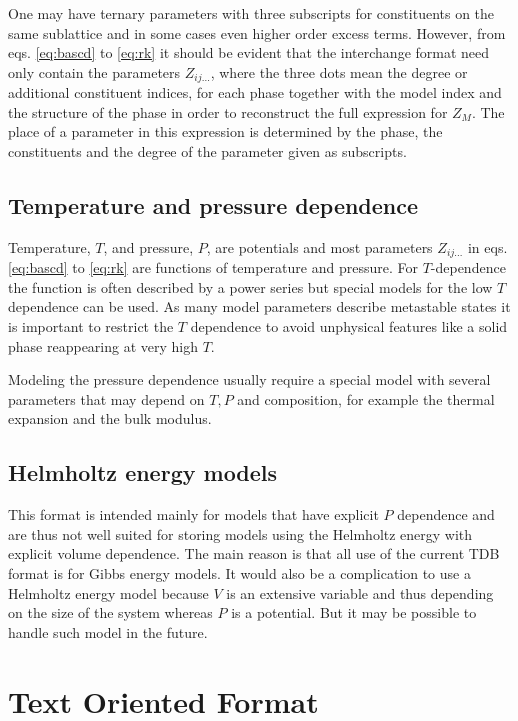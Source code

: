 \documentclass[12pt]{article}
\begin{document}
One may have ternary parameters with three subscripts for constituents
on the same sublattice and in some cases even higher order excess
terms.  However, from eqs.  \ref{eq:bascd} to \ref{eq:rk} it should be
evident that the interchange format need only contain the parameters
$Z_{ij...}$, where the three dots mean the degree or additional
constituent indices, for each phase together with the model index and
the structure of the phase in order to reconstruct the full expression
for $Z_M$.  The place of a parameter in this expression is determined
by the phase, the constituents and the degree of the parameter given
as subscripts.

\subsection{Temperature and pressure dependence}

Temperature, $T$, and pressure, $P$, are potentials and most
parameters $Z_{ij...}$ in eqs.  \ref{eq:bascd} to \ref{eq:rk} are
functions of temperature and pressure.  For $T$-dependence the
function is often described by a power series but special models for
the low $T$ dependence can be used.  As many model parameters describe
metastable states it is important to restrict the $T$ dependence to
avoid unphysical features like a solid phase reappearing at very high
$T$.

Modeling the pressure dependence usually require a special model with
several parameters that may depend on $T, P$ and composition, for
example the thermal expansion and the bulk modulus.

\subsection{Helmholtz energy models}

This format is intended mainly for models that have explicit $P$
dependence and are thus not well suited for storing models using the
Helmholtz energy with explicit volume dependence.  The main reason is
that all use of the current TDB format is for Gibbs energy models.  It
would also be a complication to use a Helmholtz energy model because
$V$ is an extensive variable and thus depending on the size of the
system whereas $P$ is a potential.  But it may be possible to handle
such model in the future.

\section{Text Oriented Format}
\end{document}
